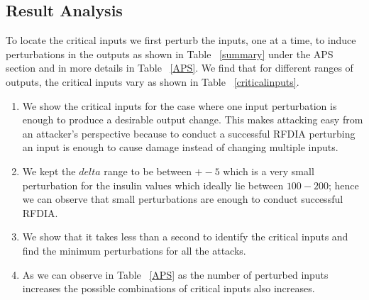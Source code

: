 \subsection{Result Analysis}
To locate the critical inputs we first perturb the inputs, one at a time, to induce perturbations in the outputs as shown in Table ~\ref{summary} under the APS section and in more details in Table ~\ref{APS}. 
We find that for different ranges of outputs, the critical inputs vary as shown in Table ~\ref{criticalinputs}.         
\begin{enumerate}
	\item We show the critical inputs for the case where one input perturbation is enough to produce a desirable output change. 
	This makes attacking easy from an attacker's perspective because to conduct a successful \ac{RFDIA} perturbing an input is enough to cause damage instead of changing multiple inputs. 
	\item We kept the $delta$ range  to be between $+-5$ which is a very small perturbation for the insulin values which ideally lie between $100-200$; hence we can observe that small perturbations are enough to conduct successful \ac{RFDIA}.  
	\item  We show that it takes less than a second to identify the critical inputs and find the minimum perturbations for all the attacks.
	\item As we can observe in Table ~\ref{APS} as the number of perturbed inputs increases the possible combinations of critical inputs also increases. 
	
\end{enumerate}


 







